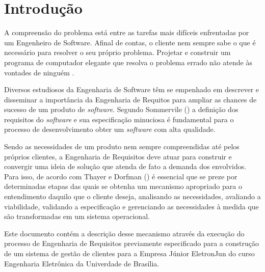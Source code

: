 \chapter[Introdução]{Introdução}

A compreensão do problema está entre as tarefas mais difíceis enfrentadas por um Engenheiro de Software. Afinal de contas, o cliente nem sempre sabe o que é necessário para resolver o seu próprio problema. Projetar e construir um programa de computador elegante que resolva o problema errado não atende às vontades de ninguém \cite{pressman}. 

Diversos estudiosos da Engenharia de Software têm se empenhado em descrever e disseminar a importância da Engenharia de Requitos para ampliar as chances de sucesso de um produto de \textit{software}. Segundo Sommervile (\citeyear{sommerville}) a definição dos requisitos do \textit{software} e sua especificação minuciosa é fundamental para o processo de desenvolvimento obter um \textit{software} com alta qualidade.

Sendo as necessidades de um produto nem sempre compreendidas até pelos próprios clientes, a Engenharia de Requisitos deve atuar para construir e convergir uma ideia de solução que atenda de fato a demanda dos envolvidos. Para isso, de acordo com Thayer e Dorfman (\citeyear{thayer}) é essencial que se preze por determinadas etapas das quais se obtenha um mecanismo apropriado para o entendimento daquilo que o cliente deseja, analisando as necessidades, avaliando a viabilidade, validando a especificação e gerenciando as necessidades à medida que são transformadas em um sistema operacional.

Este documento contém a descrição desse mecanismo através da execução do processo de Engenharia de Requisitos previamente especificado para a construção de um sistema de gestão de clientes para a Empresa Júnior EletronJun do curso Engenharia Eletrônica da Univerdade de Brasília.
